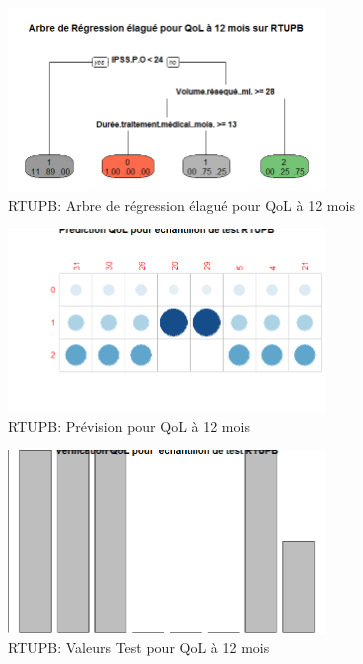 \begin{figure}[H]
\centering
\includegraphics[width=0.75\textwidth]{../Fig/RTUPB/rtupb-regtree-qol12.png}
\caption{RTUPB: Arbre de régression élagué pour QoL à 12 mois}
\label{fig-rtupb-regtree-qol12}
\end{figure}

\begin{figure}[H]
\centering
\includegraphics[width=0.75\textwidth]{../Fig/RTUPB/rtupb-regtree-predict-qol12.png}
\caption{RTUPB: Prévision pour QoL à 12 mois}
\label{fig-rtupb-regtree-predict-qol12}
\end{figure}

\begin{figure}[H]
\centering
\includegraphics[width=0.75\textwidth]{../Fig/RTUPB/rtupb-regtree-test-qol12.png}
\caption{RTUPB: Valeurs Test pour QoL à 12 mois}
\label{fig-rtupb-regtree-test-qol12}
\end{figure}

